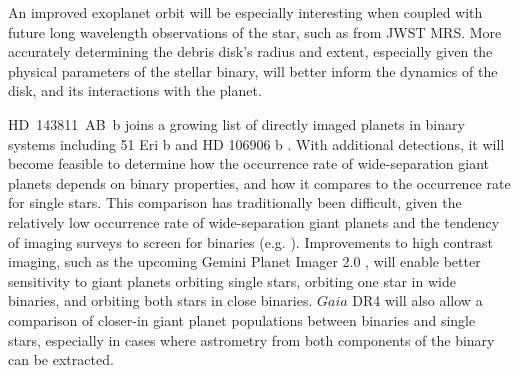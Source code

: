 \documentclass[]{aastex701} %
\begin{document}
An improved exoplanet orbit will be especially interesting when coupled with future long wavelength observations of the star, such as from JWST MRS. More accurately determining the debris disk's radius and extent, especially given the physical parameters of the stellar binary, will better inform the dynamics of the disk, and its interactions with the planet.

HD~143811~AB~b joins a growing list of directly imaged planets in binary systems including 51 Eri b \citep{macintosh:2015} and  HD 106906 b \citep{bailey:2014, derosa:2019}. With additional detections, it will become feasible to determine how the occurrence rate of wide-separation giant planets depends on binary properties, and how it compares to the occurrence rate for single stars. This comparison has traditionally been difficult, given the relatively low occurrence rate of wide-separation giant planets and the tendency of imaging surveys to screen for binaries (e.g. \citealt{bonavita:2016}). Improvements to high contrast imaging, such as the upcoming Gemini Planet Imager 2.0 \citep{chilcote:2024}, will enable better sensitivity to giant planets orbiting single stars, orbiting one star in wide binaries, and orbiting both stars in close binaries. $Gaia$ DR4 will also allow a comparison of closer-in giant planet populations between binaries and single stars, especially in cases where astrometry from both components of the binary can be extracted.
\end{document}
